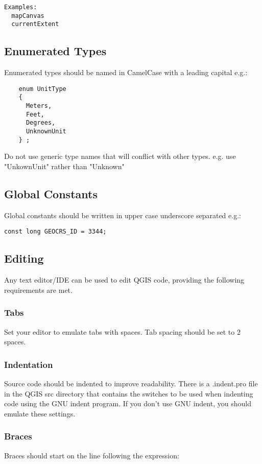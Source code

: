 \begin{verbatim}
Examples:
  mapCanvas
  currentExtent
\end{verbatim}

\subsection{Enumerated Types}
Enumerated types should be named in CamelCase with a leading capital e.g.:

\begin{verbatim}
    enum UnitType
    {
      Meters,
      Feet,
      Degrees,
      UnknownUnit
    } ;
\end{verbatim}

Do not use generic type names that will conflict with other types. e.g. use
"UnkownUnit" rather than "Unknown"

\subsection{Global Constants}
Global constants should be written in upper case underscore separated e.g.:

\begin{verbatim}
const long GEOCRS_ID = 3344;
\end{verbatim}

\subsection{Editing}
Any text editor/IDE can be used to edit QGIS code, providing the following
requirements are met.

\subsubsection{Tabs}
Set your editor to emulate tabs with spaces. Tab spacing should be set to 2
spaces.

\subsubsection{Indentation}
Source code should be indented to improve readability. There is a .indent.pro
file in the QGIS src directory that contains the switches to be used when
indenting code using the GNU indent program. If you don't use GNU indent, you
should emulate these settings.

\subsubsection{Braces}
Braces should start on the line following the expression:

